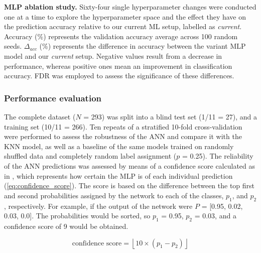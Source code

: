 \begin{center}
\captionsetup{type=table} %
\caption[MLP ablation study]{\textbf{MLP ablation study.} Sixty-four single hyperparameter changes were conducted one at a time to explore the hyperparameter space and the effect they have on the prediction accuracy relative to our current ML setup, labelled as \textit{current}. Accuracy (\%) represents the validation accuracy average across 100 random seeds. $\Delta_{acc}$ (\%) represents the difference in accuracy between the variant MLP model and our \textit{current} setup. Negative values result from a decrease in performance, whereas positive ones mean an improvement in classification accuracy. FDR was employed to assess the significance of these differences.}
\label{tab:MLP_ablation}
\end{center}

\vspace{-23pt} %
\vspace{-13pt} %

\subsubsection{Performance evaluation}

The complete dataset ($N$ = 293) was split into a blind test set (1/11 = 27), and a training set (10/11 = 266). Ten repeats of a stratified 10-fold cross-validation were performed to assess the robustness of the ANN and compare it with the KNN model, as well as a baseline of the same models trained on randomly shuffled data and completely random label assignment ($p$ = 0.25). The reliability of the ANN predictions was assessed by means of a confidence score calculated as in \cite{CUFF_2000_PROFILES}, which represents how certain the MLP is of each individual prediction (\autoref{eq:confidence_score}). The score is based on the difference between the top first and second probabilities assigned by the network to each of the classes, $p_{1}$, and $p_{2}$, respectively. For example, if the output of the network were $P$ = [0.95, 0.02, 0.03, 0.0]. The probabilities would be sorted, so $p_{1}$ = 0.95, $p_{2}$ = 0.03, and a confidence score of 9 would be obtained.

\vspace{-12pt} %

\begin{equation}
\text{confidence score} = \left\lfloor 10 \times (p_1 - p_2) \right\rfloor
\label{eq:confidence_score}
\end{equation}

